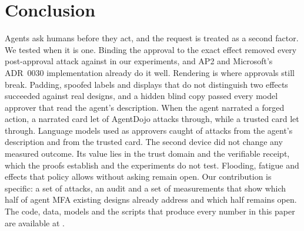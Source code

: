 \section{Conclusion}\label{sec:conclusion}

Agents ask humans before they act, and the request is treated as a second factor. We tested when it is one. Binding
the approval to the exact effect removed every post-approval attack against \sys{} in our experiments, and AP2 and
Microsoft's ADR~0030 implementation already do it well. Rendering is where approvals still break.
Padding, spoofed labels and displays that do not distinguish two effects succeeded against real designs, and a
hidden blind copy passed every model approver that read the agent's description. When the agent narrated a forged
action, a narrated card let \adFExNarr{} of AgentDojo attacks through, while a trusted card let \adFExAsu{}
through. Language models used as approvers caught \llmCatchNarr{} of attacks from the agent's
description and \llmCatchCard{} from the trusted card. The second device did not change any measured outcome. Its
value lies in the trust domain and the verifiable receipt, which the proofs establish and the experiments do not
test. Flooding, fatigue and effects that policy allows without asking remain open. Our contribution is specific: a set of attacks, an audit and a set of measurements that show which half of agent
MFA existing designs already address and which half remains open. The code, data, models and the scripts that produce every number in this paper are available
at \codeurl{}.
